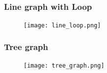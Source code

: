 \documentclass{beamer}
\begin{document}
\begin{frame}
\frametitle{Line graph with Loop}
\begin{figure}
	\centering
		\texttt{[image: line\_loop.png]}
\end{figure}
\end{frame}

\begin{frame}
\frametitle{Tree graph}
\begin{figure}
	\centering
		\texttt{[image: tree\_graph.png]}
\end{figure}
\end{frame}
\fi
\end{document}
